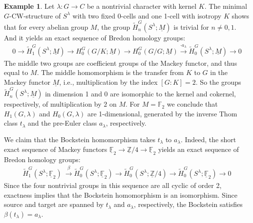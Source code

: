 \documentclass{amsart}[12pt]
\newcommand{\mF}{{\mathbb F}}
\newcommand{\mZ}{{\mathbb Z}}
\newcommand{\xra}{\xrightarrow}
\renewcommand{\to}{\longrightarrow}
\numberwithin{equation}{section}
\theoremstyle{definition}
\newtheorem{eg}[equation]{Example}
\begin{document}
\begin{eg}
  Let $\lambda:G\to C$ be a nontrivial character with kernel $K$.
  The minimal $G$-CW-structure of $S^\lambda$ with two fixed 0-cells
  and one 1-cell with isotropy $K$ shows that for every abelian group $M$,
  the group $\tilde H_n^G(S^\lambda;\underline M)$ is trivial for $n\ne 0,1$.
  And it yields an exact sequence of Bredon homology groups:
    \begin{align*}
     0 \to  \tilde H^G_1(S^\lambda;\underline M)\to
      H^G_0(G/K;\underline M)\to H^G_0(G/G;\underline M) \xra{\cdot a_\lambda}
      \tilde H_0^G(S^\lambda;\underline M)\to 0
  \end{align*}
  The middle two groups are coefficient groups of the Mackey functor,
  and thus equal to $M$. The middle homomorphism
  is the transfer from $K$ to $G$ in the Mackey functor $\underline M$,
  i.e., multiplication by the index $[G:K]=2$.
  So the groups $\tilde H_n^G(S^\lambda;\underline M)$
  in dimension 1 and 0 are isomorphic to the kernel and cokernel,
  respectively, of multiplication by $2$ on $M$.
  For $M=\mF_2$ we conclude that $H_1(G,\lambda)$ and $H_0(G,\lambda)$
  are 1-dimensional, generated by the inverse Thom class $t_\lambda$
  and the pre-Euler class $a_\lambda$, respectively.

  We claim that the Bockstein homomorphism takes $t_\lambda$ to $a_\lambda$.
  Indeed, the short exact sequence of Mackey functors
  $\underline\mF_2\to\underline\mZ/4\to\underline\mF_2$
  yields an exact sequence of Bredon homology groups:
  \begin{align*}
    \tilde H^G_1(S^\lambda;\underline\mF_2)\ \xra{\ \beta\ }   \tilde H^G_0(S^\lambda;\underline\mF_2)\to
    \tilde H^G_0(S^\lambda;\underline{\mZ}/4)\to
    \tilde H^G_0(S^\lambda;\underline\mF_2)\to 0
  \end{align*}
  Since the four nontrivial groups in this sequence are all cyclic of order 2,
  exactness implies that the Bockstein homomorphism is an isomorphism.
  Since source and target are spanned by $t_\lambda$ and $a_\lambda$, respectively,
  the Bockstein satisfies $\beta(t_\lambda)=a_\lambda$.
\end{eg}
\end{document}
